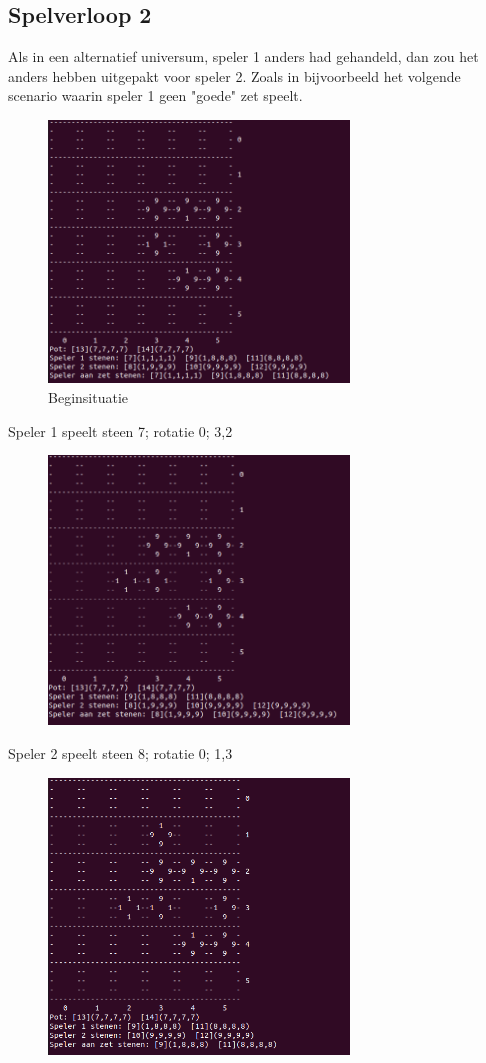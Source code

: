 \documentclass{article}
\begin{document}
\subsection{Spelverloop 2}
Als in een alternatief universum, speler 1 anders had gehandeld, dan zou het anders hebben uitgepakt voor speler 2. Zoals in bijvoorbeeld het volgende scenario waarin speler 1 geen "goede" zet speelt.
\begin{figure}[htp]
    \centering
    \includegraphics[width=8cm]{algo1/imgs/one.png}
    \caption{Beginsituatie}
    \label{fig:galaxy}
\end{figure}
\newpage
Speler 1 speelt steen 7; rotatie 0; 3,2
\begin{figure}[htp]
    \centering
    \includegraphics[width=8cm]{algo1/imgs/two_2.png}
    \label{fig:galaxy}
\end{figure}
\newpage
Speler 2 speelt steen 8; rotatie 0; 1,3
\begin{figure}[htp]
    \centering
    \includegraphics[width=8cm]{algo1/imgs/three_2.png}
    \label{fig:galaxy}
\end{figure}
\end{document}
